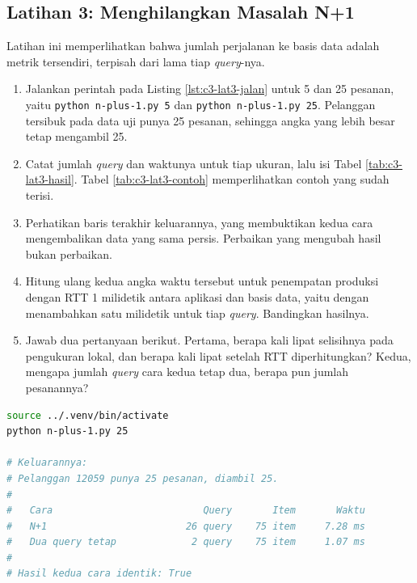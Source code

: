 \subsection*{Latihan 3: Menghilangkan Masalah N+1}

Latihan ini memperlihatkan bahwa jumlah perjalanan ke basis data adalah metrik
tersendiri, terpisah dari lama tiap \textit{query}-nya.

\begin{enumerate}
  \item Jalankan perintah pada Listing \ref{lst:c3-lat3-jalan} untuk 5 dan 25
        pesanan, yaitu \texttt{python n-plus-1.py 5} dan
        \texttt{python n-plus-1.py 25}. Pelanggan tersibuk pada data uji punya
        25 pesanan, sehingga angka yang lebih besar tetap mengambil 25.
  \item Catat jumlah \textit{query} dan waktunya untuk tiap ukuran, lalu isi Tabel \ref{tab:c3-lat3-hasil}. Tabel \ref{tab:c3-lat3-contoh} memperlihatkan contoh
        yang sudah terisi.
  \item Perhatikan baris terakhir keluarannya, yang membuktikan kedua cara
        mengembalikan data yang sama persis. Perbaikan yang mengubah hasil bukan
        perbaikan.
  \item Hitung ulang kedua angka waktu tersebut untuk penempatan produksi
        dengan RTT 1 milidetik antara aplikasi dan basis data, yaitu dengan
        menambahkan satu milidetik untuk tiap \textit{query}. Bandingkan hasilnya.
  \item Jawab dua pertanyaan berikut. Pertama, berapa kali lipat selisihnya pada
        pengukuran lokal, dan berapa kali lipat setelah RTT diperhitungkan?
        Kedua, mengapa jumlah \textit{query} cara kedua tetap dua, berapa pun jumlah
        pesanannya?
\end{enumerate}

\begin{lstlisting}[language=bash, caption={Membandingkan N+1 dengan query yang jumlahnya tetap, tersedia di \berkas{sources/chapter03/n-plus-1.py}}, label={lst:c3-lat3-jalan}]
source ../.venv/bin/activate
python n-plus-1.py 25

# Keluarannya:
# Pelanggan 12059 punya 25 pesanan, diambil 25.
#
#   Cara                          Query       Item       Waktu
#   N+1                        26 query    75 item     7.28 ms
#   Dua query tetap             2 query    75 item     1.07 ms
#
# Hasil kedua cara identik: True
\end{lstlisting}


